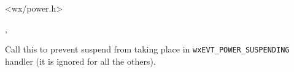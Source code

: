 
<wx/power.h>


, 



\label{wxpowereventveto}


Call this to prevent suspend from taking place in 
\texttt{wxEVT\_POWER\_SUSPENDING} handler (it is ignored for all the others).


